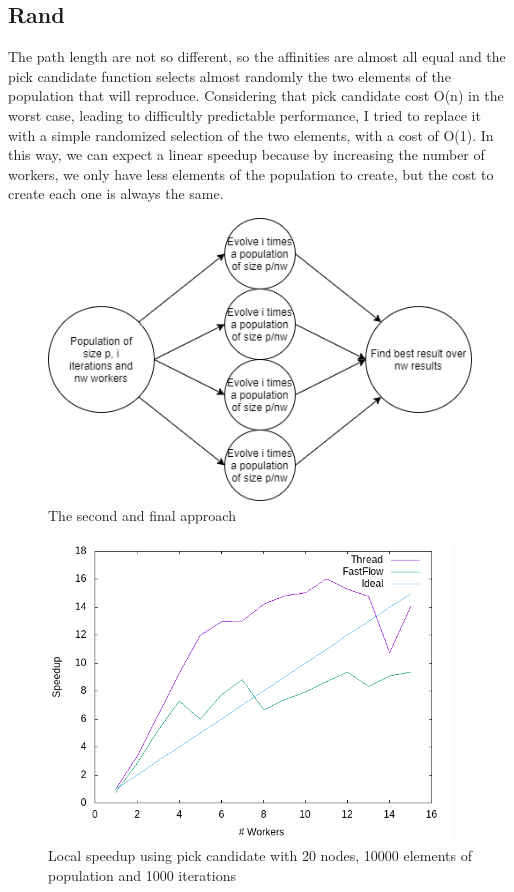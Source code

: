 \documentclass{article}
\begin{document}
	\subsection{Rand}\label{sec:s32}
The path length are not so different, so the affinities are almost all equal and the pick candidate function selects almost randomly the two elements of the population that will reproduce. Considering that pick candidate cost O(n) in the worst case, leading to difficultly predictable performance, I tried to replace it with a simple randomized selection of the two elements, with a cost of O(1). In this way, we can expect a linear speedup because by increasing the number of workers, we only have less elements of the population to create, but the cost to create each one is always the same.

    \begin{figure}
        \includegraphics[width=\linewidth]{img/second.png}
        \caption{The second and final approach}
        \label{fig:second}
    \end{figure}

    \begin{figure}
        \includegraphics[width=\linewidth,height=8cm]{img/local_s_pick.png}
        \caption{Local speedup using pick candidate with 20 nodes, 10000 elements of population and 1000 iterations}
        \label{fig:local_speedup}
    \end{figure}
\end{document}
